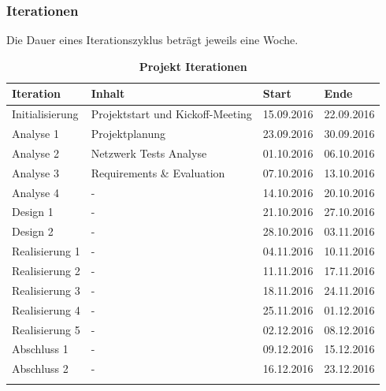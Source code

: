 \documentclass[a4,12pt]{scrartcl}
\begin{document}
\subsubsection{Iterationen}
Die Dauer eines Iterationszyklus beträgt jeweils eine Woche. 
\begin{table}[htb]
\centering
    \begin{tabular}{@{} p{3cm} l l l@{}}\toprule    
    {Iteration} & {Inhalt} & {Start} & {Ende}\\ \midrule
    Initialisierung & Projektstart und Kickoff-Meeting & 15.09.2016 & 22.09.2016\\ \addlinespace
    Analyse 1 & Projektplanung & 23.09.2016 & 30.09.2016\\ \addlinespace
    Analyse 2 & Netzwerk Tests Analyse & 01.10.2016 & 06.10.2016\\ \addlinespace
    Analyse 3 & Requirements \& Evaluation & 07.10.2016 & 13.10.2016\\ \addlinespace
    Analyse 4 & - & 14.10.2016 & 20.10.2016\\ \addlinespace
    Design 1 & - & 21.10.2016 & 27.10.2016\\ \addlinespace
    Design 2 & - & 28.10.2016  & 03.11.2016\\ \addlinespace
    Realisierung 1 & - & 04.11.2016  & 10.11.2016\\ \addlinespace
    Realisierung 2 & - & 11.11.2016  & 17.11.2016\\ \addlinespace
    Realisierung 3 & - & 18.11.2016  & 24.11.2016\\ \addlinespace
    Realisierung 4 & - & 25.11.2016  & 01.12.2016\\ \addlinespace
    Realisierung 5 & - & 02.12.2016  & 08.12.2016\\ \addlinespace
    Abschluss 1 & - &  09.12.2016 & 15.12.2016\\ \addlinespace
    Abschluss 2 & - &  16.12.2016 & 23.12.2016\\ \addlinespace
    \bottomrule
    \end{tabular}
\caption{\textbf{Projekt Iterationen}}
\end{table}
\end{document}

